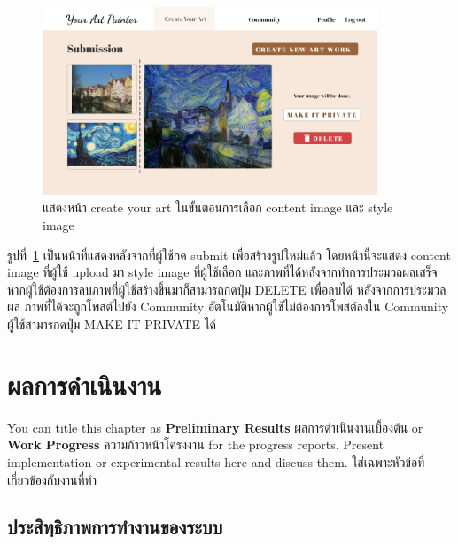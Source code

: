 \documentclass[12pt,oneside,openright,a4paper]{cpe-thai-project}
\begin{document}
\newpage
\begin{figure}[!h]
  \centering
  \includegraphics[width=10cm]{./image/ui-create2.png}
  \caption{แสดงหน้า create your art ในขั้นตอนการเลือก content image และ style image}
  \label{fig:ui-create2}
\end{figure}
\par\setlength{\parindent}{5ex}
รูปที่~\ref{fig:ui-create2} เป็นหน้าที่แสดงหลังจากที่ผู้ใช้กด submit เพื่อสร้างรูปใหม่แล้ว โดยหน้านี้จะแสดง content image ที่ผู้ใช้ upload มา style image ที่ผู้ใช้เลือก และภาพที่ได้หลังจากทำการประมวลผลเสร็จ หากผู้ใช้ต้องการลบภาพที่ผู้ใช้สร้างขึ้นมาก็สามารถกดปุ่ม DELETE เพื่อลบได้ หลังจากการประมวลผล ภาพที่ได้จะถูกโพสต์ไปยัง Community อัตโนมัติหากผู้ใช้ไม่ต้องการโพสต์ลงใน Community ผู้ใช้สามารกดปุ่ม MAKE IT PRIVATE ได้
























\chapter{ผลการดำเนินงาน}

You can title this chapter as \textbf{Preliminary Results} ผลการดำเนินงานเบื้องต้น or \textbf{Work Progress} ความก้าวหน้าโครงงาน for the progress reports. Present implementation or experimental results here and discuss them.
ใส่เฉพาะหัวข้อที่เกี่ยวข้องกับงานที่ทำ 

\section{ประสิทฺธิภาพการทำงานของระบบ} 
\end{document}
